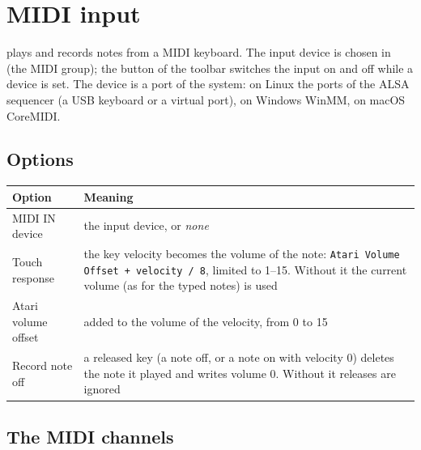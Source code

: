 \chapter{MIDI input}\label{ch:midi}

\RITMO{} plays and records notes from a MIDI keyboard. The input device is chosen in  (the MIDI
group); the button  of the toolbar switches the input on and off while a device is set. The device is a port
of the system: on Linux the ports of the ALSA sequencer (a USB keyboard or a virtual port), on Windows WinMM, on macOS CoreMIDI.

\section{Options}

\begin{center}
\begin{tabular}{@{}lp{10.2cm}@{}}
\toprule
Option & Meaning \\ \midrule
MIDI IN device & the input device, or \emph{none} \\
Touch response & the key velocity becomes the volume of the note: \texttt{Atari Volume Offset + velocity / 8}, limited to 1--15. Without it the
  current volume (as for the typed notes) is used \\
Atari volume offset & added to the volume of the velocity, from 0 to 15 \\
Record note off & a released key (a note off, or a note on with velocity 0) deletes the note it played and writes volume 0. Without it releases are
  ignored \\
\bottomrule
\end{tabular}
\end{center}

\section{The MIDI channels}

